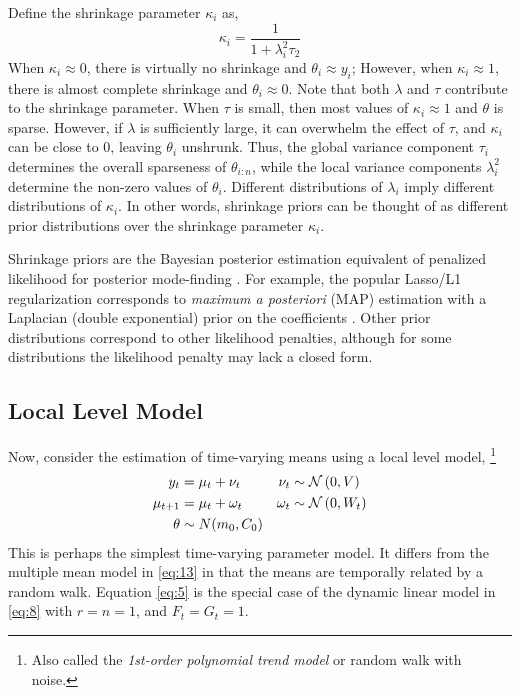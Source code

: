\documentclass{article}
\begin{document}
Define the shrinkage parameter $\kappa_{i}$ as,
\begin{equation}
  \label{eq:19}
  \kappa_{i} = \frac{1}{1 + \lambda^{2}_{i} \tau_{2}}
\end{equation}
When $\kappa_{i} \approx 0$, there is virtually no shrinkage and $\theta_{i} \approx y_{i}$;
However, when $\kappa_{i} \approx 1$, there is almost complete shrinkage and $\theta_{i} \approx 0$.
Note that both $\lambda$ and $\tau$ contribute to the shrinkage parameter.
When $\tau$ is small, then most values of $\kappa_{i} \approx 1$ and $\theta$ is sparse.
However, if $\lambda$ is sufficiently large, it can overwhelm the effect of $\tau$, and $\kappa_{i}$ can be close to 0, leaving $\theta_{i}$ unshrunk.
Thus, the global variance component $\tau_{i}$ determines the overall sparseness of $\theta_{i:n}$, while the local variance components $\lambda_{i}^{2}$ determine the non-zero values of $\theta_{i}$.
Different distributions of $\lambda_{i}$ imply different distributions of $\kappa_{i}$.
In other words, shrinkage priors can be thought of as different prior distributions over the shrinkage parameter $\kappa_{i}$.

Shrinkage priors are the Bayesian posterior estimation equivalent of penalized likelihood for posterior mode-finding \parencites{PolsonScott2010}{PolsonScott2012a}.
For example, the popular Lasso/L1 regularization \parencite{Tibshirani1996} corresponds to \textit{maximum a posteriori} (MAP) estimation with a Laplacian (double exponential) prior on the coefficients \parencites{ParkCasella2008}{Hans2009}.
Other prior distributions correspond to other likelihood penalties, although for some distributions the likelihood penalty may lack a closed form.

\subsection{Local Level Model}
\label{sec:local-level-model}

Now, consider the estimation of time-varying means using a local level model,
\footnote{Also called the \textit{1st-order polynomial trend model} \parencite[Chapter 2]{WestHarrison1997} or random walk with noise.}
\begin{equation}
  \label{eq:5}
  \begin{aligned}[t]
    y_{t} &= \mu_{t} + \nu_{t} & \nu_{t} & \sim \mathcal{N}\left(0, V\right) \\
    \mu_{t + 1} &= \mu_{t} + \omega_{t} & \omega_{t} & \sim \mathcal{N}\left(0, W_{t}\right) \\
    \theta & \sim N(m_{0}, C_{0})
  \end{aligned}
\end{equation}
This is perhaps the simplest time-varying parameter model.
It differs from the multiple mean model in \eqref{eq:13} in that the means are temporally related by a random walk.
Equation \eqref{eq:5} is the special case of the dynamic linear model in \eqref{eq:8} with $r = n = 1$, and $F_{t} = G_{t} = 1$.
\end{document}
